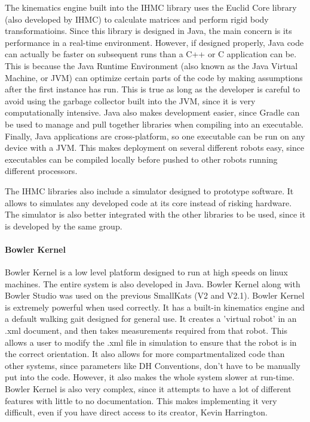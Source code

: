 The kinematics engine built into the IHMC library uses the Euclid Core library (also developed by IHMC) to calculate matrices and perform rigid body transformatioins. Since this library is designed in Java, the main concern is its performance in a real-time environment. However, if designed properly, Java code can actually be faster on subsequent runs than a C++ or C application can be. This is because the Java Runtime Environment (also known as the Java Virtual Machine, or JVM) can optimize certain parts of the code by making assumptions after the first instance has run. This is true as long as the developer is careful to avoid using the garbage collector built into the JVM, since it is very computationally intensive. Java also makes development easier, since Gradle can be used to manage and pull together libraries when compiling into an executable. Finally, Java applications are cross-platform, so one executable can be run on any device with a JVM. This makes deployment on several different robots easy, since executables can be compiled locally before pushed to other robots running different processors.

The IHMC libraries also include a simulator designed to prototype software. It allows to simulates any developed code at its core instead of risking hardware. The simulator is also better integrated with the other libraries to be used, since it is developed by the same group.

\paragraph*{Bowler Kernel}
Bowler Kernel is a low level platform designed to run at high speeds on linux machines. The entire system is also developed in Java. Bowler Kernel along with Bowler Studio was used on the previous SmallKats (V2 and V2.1). Bowler Kernel is extremely powerful when used correctly. It has a built-in kinematics engine and a default walking gait designed for general use. It creates a 'virtual robot' in an .xml document, and then takes measurements required from that robot. This allows a user to modify the .xml file in simulation to ensure that the robot is in the correct orientation. It also allows for more compartmentalized code than other systems, since parameters like DH Conventions, don't have to be manually put into the code. However, it also makes the whole system slower at run-time. Bowler Kernel is also very complex, since it attempts to have a lot of different features with little to no documentation. This makes implementing it very difficult, even if you have direct access to its creator, Kevin Harrington.

